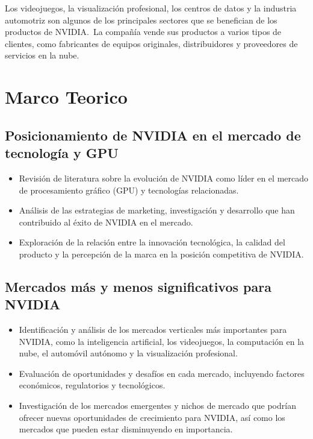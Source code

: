 \documentclass[letterpaper, 12pt]{article}
\begin{document}
Los videojuegos, la visualización profesional, los centros
de datos y la industria automotriz son algunos de los
principales sectores que se benefician de los productos de NVIDIA.~La
compañía vende sus productos a varios tipos de clientes,
como fabricantes de equipos originales, distribuidores y
proveedores de servicios en la nube.

\section{Marco Teorico}

\subsection*{Posicionamiento de NVIDIA en el mercado de tecnología y GPU}

\begin{itemize}
      \item Revisión de literatura sobre la evolución de NVIDIA
            como líder en el mercado de procesamiento gráfico (GPU) y
            tecnologías relacionadas.

      \item Análisis de las estrategias de marketing,
            investigación y desarrollo que han contribuido al éxito de
            NVIDIA en el mercado.

      \item Exploración de la relación entre la innovación
            tecnológica, la calidad del producto y la percepción de la
            marca en la posición competitiva de NVIDIA.\@{}
\end{itemize}

\subsection*{Mercados más y menos significativos para NVIDIA}

\begin{itemize}
      \item Identificación y análisis de los mercados verticales más
            importantes para NVIDIA, como la inteligencia artificial, los
            videojuegos, la computación en la nube, el automóvil autónomo
            y la visualización profesional.

      \item Evaluación de oportunidades y desafíos en cada mercado,
            incluyendo factores económicos, regulatorios y tecnológicos.

      \item Investigación de los mercados emergentes y nichos
            de mercado que podrían ofrecer nuevas oportunidades de
            crecimiento para NVIDIA, así como los mercados que pueden
            estar disminuyendo en importancia.
\end{itemize}
\end{document}
